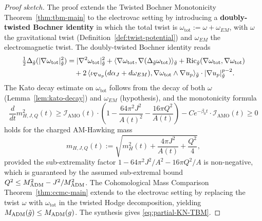 \begin{proof}[Proof sketch]
The proof extends the Twisted Bochner Monotonicity Theorem~\ref{thm:tbm-main} to the electrovac setting by introducing a \textbf{doubly-twisted Bochner identity} in which the total twist is $\omega_{\mathrm{tot}} := \omega + \omega_{EM}$, with $\omega$ the gravitational twist (Definition~\ref{def:twist-potential}) and $\omega_{EM}$ the electromagnetic twist. The doubly-twisted Bochner identity reads
\begin{equation}\label{eq:doubly-twisted-bochner}
\begin{aligned}
\tfrac{1}{2}\Delta_{\tilde{g}}(|\nabla \omega_{\mathrm{tot}}|_{\tilde{g}}^2)
&= |\nabla^2 \omega_{\mathrm{tot}}|_{\tilde{g}}^2 + \langle \nabla \omega_{\mathrm{tot}}, \nabla(\Delta_{\tilde{g}} \omega_{\mathrm{tot}})\rangle_{\tilde{g}} + \mathrm{Ric}_{\tilde{g}}(\nabla \omega_{\mathrm{tot}}, \nabla \omega_{\mathrm{tot}}) \\
&\quad + 2\,\langle \iota_{\nabla u_p} (d\alpha_J + d\omega_{EM}), \nabla \omega_{\mathrm{tot}} \wedge \nabla u_p \rangle_{\tilde{g}} \cdot |\nabla u_p|_{\tilde{g}}^{p-2}.
\end{aligned}
\end{equation}
The Kato decay estimate on $\omega_{\mathrm{tot}}$ follows from the decay of both $\omega$ (Lemma~\ref{lem:kato-decay}) and $\omega_{EM}$ (hypothesis), and the monotonicity formula
\begin{equation}
\frac{d}{dt} m_{H,J,Q}^2(t) \geq \mathcal{I}_{\mathrm{AMO}}(t) \cdot \left(1 - \frac{64\pi^2 J^2}{A(t)^2} - \frac{16\pi Q^2}{A(t)}\right) - C e^{-\beta_0 t} \cdot \mathcal{I}_{\mathrm{AMO}}(t) \geq 0
\end{equation}
holds for the charged AM-Hawking mass
\begin{equation}
m_{H,J,Q}(t) := \sqrt{m_H^2(t) + \frac{4\pi J^2}{A(t)} + \frac{Q^2}{4}},
\end{equation}
provided the sub-extremality factor $1 - 64\pi^2 J^2/A^2 - 16\pi Q^2/A$ is non-negative, which is guaranteed by the assumed sub-extremal bound $Q^2 \leq M_{\mathrm{ADM}}^2 - J^2/M_{\mathrm{ADM}}^2$. The Cohomological Mass Comparison Theorem~\ref{thm:ccmc-main} extends to the electrovac setting by replacing the twist $\omega$ with $\omega_{\mathrm{tot}}$ in the twisted Hodge decomposition, yielding $M_{\mathrm{ADM}}(\tilde{g}) \leq M_{\mathrm{ADM}}(g)$. The synthesis gives \eqref{eq:partial-KN-TBM}.
\end{proof}

